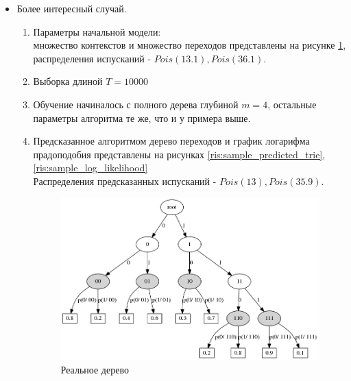 \documentclass{matmex-diploma-custom}
\begin{document}
\begin{itemize}
\begin{enumerate}
\end{enumerate}
\item
Более интересный случай. 
\begin{enumerate}
\item Параметры начальной модели: 
\\множество контекстов и множество переходов представлены на рисунке \ref{ris:sample_real_trie}, распределения испусканий - $Pois(13.1), Pois(36.1)$. 
\item Выборка длиной $ T = 10000 $
\item Обучение начиналось с полного дерева глубиной $ m = 4 $, остальные параметры алгоритма те же, что и у примера выше.
\item Предсказанное алгоритмом дерево переходов и график логарифма прадоподобия представлены на рисунках \ref{ris:sample_predicted_trie},\ref{ris:sample_log_likelihood}
\\Распределения предсказанных испусканий - $Pois(13), Pois(35.9)$.
\begin{figure}[ht]\centering
	\parbox[b]{ 0.49 \textwidth}{
	\includegraphics[scale=0.3]{img/sample/real_trie_.png}
	\centering
	\caption{ Реальное дерево }
	\label{ris:sample_real_trie}
	
}
\end{figure}
\end{enumerate}
\end{itemize}
\end{document}
